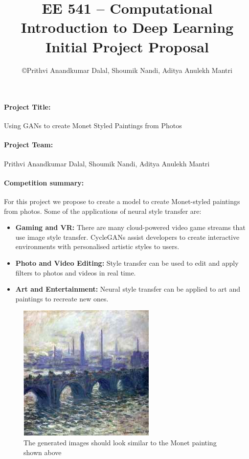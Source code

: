 \documentclass[11pt]{article}
\title{\bf {\small EE 541 -- Computational Introduction to Deep Learning} \\ Initial Project Proposal}
\author{\copyright Prithvi Anandkumar Dalal, Shoumik Nandi, Aditya Anulekh Mantri}
\begin{document}
    \maketitle

    \paragraph{Project Title:}  Using GANs to create Monet Styled Paintings from Photos

    \paragraph{Project Team:} Prithvi Anandkumar Dalal, Shoumik Nandi, Aditya Anulekh Mantri

    \paragraph{Competition summary:}
    For this project we propose to create a model to create Monet-styled paintings from photos.
    Some of the applications of neural style transfer are:
    \begin{itemize}
        \item \textbf{Gaming and VR:} There are many cloud-powered video game streams that use image style transfer. CycleGANs assist developers to create interactive environments with personalised artistic styles to users.
        \item \textbf{Photo and Video Editing:} Style transfer can be used to edit and apply filters to photos and videos in real time.
        \item \textbf{Art and Entertainment:} Neural style transfer can be applied to art and paintings to recreate new ones.
    \end{itemize}


    \begin{figure}[!htb]
        \begin{center}
            \includegraphics[width=0.3\linewidth]{images/3b262c6726}
            \caption{The generated images should look similar to the Monet painting shown above}
            \label{fig:nseg}
        \end{center}
        \vspace{-0.6cm}
    \end{figure}
\end{document}
